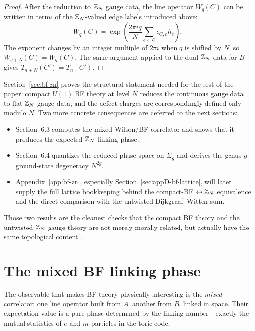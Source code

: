 \begin{proof}
After the reduction to $\mathbb{Z}_N$ gauge data, the line operator $W_q(C)$ can be written in terms of the $\mathbb{Z}_N$-valued edge labels introduced above:
\begin{equation*}
\!\!\!
W_q(C)
=
\exp\!\left(\frac{2\pi i q}{N}\sum_{e\subset C}\epsilon_{C,e}h_e\right).
\end{equation*}
The exponent changes by an integer multiple of $2\pi i$ when $q$ is shifted by $N$, so $W_{q+N}(C)=W_q(C)$. The same argument applied to the dual $\mathbb{Z}_N$ data for $B$ gives $T_{n+N}(C')=T_n(C')$.
\end{proof}

\begin{remark}\label{rem:bf-zn-scope}
Section~\ref{sec:bf-zn} proves the structural statement needed for the rest of the paper: compact $U(1)$ BF theory at level $N$ reduces the continuous gauge data to flat $\mathbb{Z}_N$ gauge data, and the defect charges are correspondingly defined only modulo $N$. Two more concrete consequences are deferred to the next sections:
\begin{itemize}
\item Section~6.3 computes the mixed Wilson/BF correlator and shows that it produces the expected $\mathbb{Z}_N$ linking phase.
\item Section~6.4 quantizes the reduced phase space on $\Sigma_g$ and derives the genus-$g$ ground-state degeneracy $N^{2g}$.
\item Appendix~\ref{app:bf-zn}, especially Section~\ref{sec:appD-bf-lattice}, will later supply the full lattice bookkeeping behind the compact-BF $\leftrightarrow \mathbb{Z}_N$ equivalence and the direct comparison with the untwisted Dijkgraaf--Witten sum.
\end{itemize}
Those two results are the cleanest checks that the compact BF theory and the untwisted $\mathbb{Z}_N$ gauge theory are not merely morally related, but actually have the same topological content \cite{Horowitz1989,GKSW2015,Bhardwaj2023Lectures}.
\end{remark}

\section{The mixed BF linking phase}\label{sec:bf-linking}

The observable that makes BF theory physically interesting is the \emph{mixed} correlator: one line operator built from $A$, another from $B$, linked in space.  Their expectation value is a pure phase determined by the linking number---exactly the mutual statistics of $e$ and $m$ particles in the toric code.


